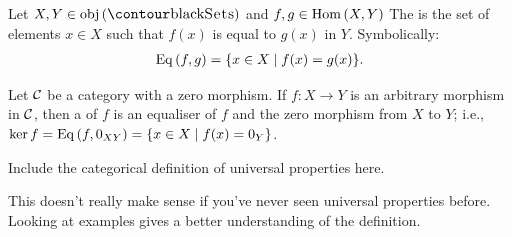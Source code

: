     \begin{definition}
        Let $X,Y \in \obj{(\cSets)}$ and $f,g \in \operatorname{Hom}{(X,Y)}$ The  is the set of elements $x \in X$ such that $f(x)$ is equal to $g(x)$ in $Y$. Symbolically:
            \begin{equation*}
            \begin{split}
                \operatorname{Eq}{(f,g)} = \{x \in X \mid f(x) = g(x) \}.
            \end{split}
            \end{equation*}
    \end{definition}

    \begin{definition}\label{def:category-kernels}
        Let $\mathcal{C}$ be a category with a zero morphism. If $f:X \rightarrow Y$ is an arbitrary morphism in $\mathcal{C}$, then a  of $f$ is an equaliser of $f$ and the zero morphism from $X$ to $Y$; i.e., $\ker{f} = \operatorname{Eq}{(f,0_{XY})} = \{x \in X \mid f(x) = 0_Y\}$.
    \end{definition}

    \begin{definition}
        Include the categorical definition of universal properties here.
    \end{definition}

    \begin{note}
        This doesn't really make sense if you've never seen universal properties before. Looking at examples gives a better understanding of the definition.
    \end{note}

